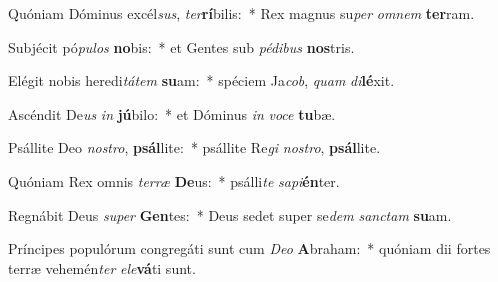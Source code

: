 \item Quóniam Dóminus excél\textit{sus}, \textit{ter}\textbf{rí}bilis:~* Rex magnus su\textit{per} \textit{om}\textit{nem} \textbf{ter}ram.
\item Subjécit pó\textit{pu}\textit{los} \textbf{no}bis:~* et Gentes sub \textit{pé}\textit{di}\textit{bus} \textbf{nos}tris.
\item Elégit nobis heredi\textit{tá}\textit{tem} \textbf{su}am:~* spéciem Ja\textit{cob}, \textit{quam} \textit{di}\textbf{lé}xit.
\item Ascéndit De\textit{us} \textit{in} \textbf{jú}bilo:~* et Dóminus \textit{in} \textit{vo}\textit{ce} \textbf{tu}bæ.
\item Psállite Deo \textit{nos}\textit{tro}, \textbf{psál}lite:~* psállite Re\textit{gi} \textit{nos}\textit{tro}, \textbf{psál}lite.
\item Quóniam Rex omnis \textit{ter}\textit{ræ} \textbf{De}us:~* psálli\textit{te} \textit{sa}\textit{pi}\textbf{én}ter.
\item Regnábit Deus \textit{su}\textit{per} \textbf{Gen}tes:~* Deus sedet super se\textit{dem} \textit{sanc}\textit{tam} \textbf{su}am.
\item Príncipes populórum congregáti sunt cum \textit{De}\textit{o} \textbf{A}braham:~* quóniam dii fortes terræ vehemén\textit{ter} \textit{e}\textit{le}\textbf{vá}ti sunt.
